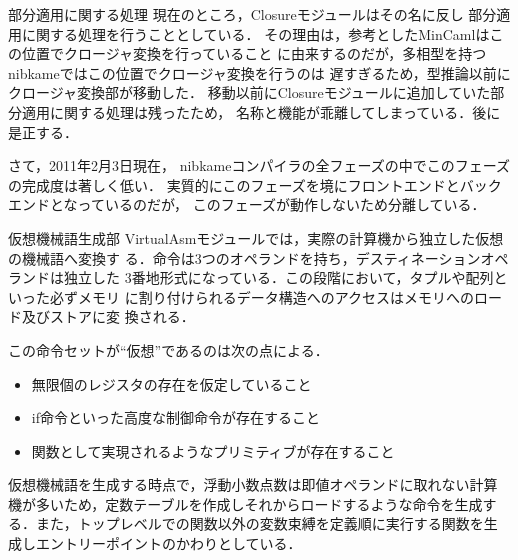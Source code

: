 \documentclass[a4paper,titlepage,report,disablejfam]{jsbook}
\begin{document}
\begin{resbonsiblesection}{部分適用に関する処理}{\sakamoto}\label{sc:impl-partial-application}
現在のところ，Closureモジュールはその名に反し
部分適用に関する処理を行うこととしている．
その理由は，参考としたMinCamlはこの位置でクロージャ変換を行っていること
に由来するのだが，多相型を持つnibkameではこの位置でクロージャ変換を行うのは
遅すぎるため，型推論以前にクロージャ変換部が移動した．
移動以前にClosureモジュールに追加していた部分適用に関する処理は残ったため，
名称と機能が乖離してしまっている．後に是正する．

さて，2011年2月3日現在，
nibkameコンパイラの全フェーズの中でこのフェーズの完成度は著しく低い．
実質的にこのフェーズを境にフロントエンドとバックエンドとなっているのだが，
このフェーズが動作しないため分離している．
\end{resbonsiblesection}

\begin{resbonsiblesection}{仮想機械語生成部}{\kobori}\label{sc:impl-virtualasm}
 VirtualAsmモジュールでは，実際の計算機から独立した仮想の機械語へ変換す
 る．命令は3つのオペランドを持ち，デスティネーションオペランドは独立した
 3番地形式になっている．この段階において，タプルや配列といった必ずメモリ
 に割り付けられるデータ構造へのアクセスはメモリへのロード及びストアに変
 換される．

 この命令セットが``仮想''であるのは次の点による．
 \begin{itemize}
  \item 無限個のレジスタの存在を仮定していること
  \item if命令といった高度な制御命令が存在すること
  \item 関数として実現されるようなプリミティブが存在すること
 \end{itemize}

 仮想機械語を生成する時点で，浮動小数点数は即値オペランドに取れない計算
 機が多いため，定数テーブルを作成しそれからロードするような命令を生成す
 る．また，トップレベルでの関数以外の変数束縛を定義順に実行する関数を生
 成しエントリーポイントのかわりとしている．
\end{resbonsiblesection}
\end{document}
